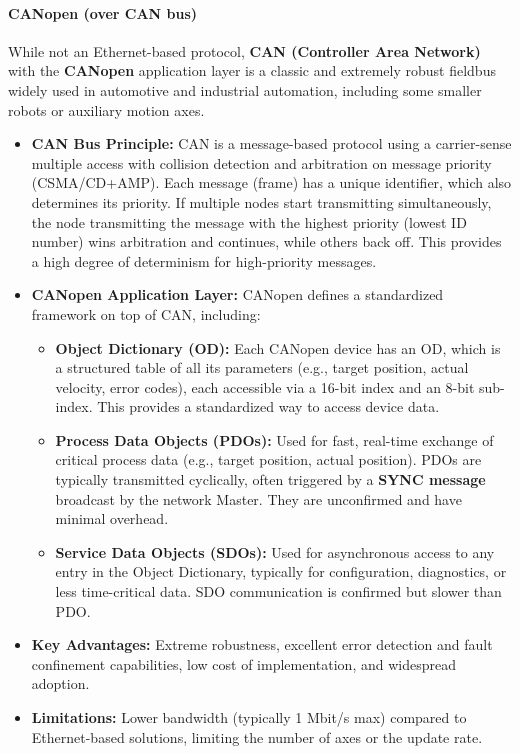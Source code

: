 \paragraph{CANopen (over CAN bus)}
While not an Ethernet-based protocol, \textbf{CAN (Controller Area Network)} with the \textbf{CANopen} application layer is a classic and extremely robust fieldbus widely used in automotive and industrial automation, including some smaller robots or auxiliary motion axes.
\begin{itemize}
    \item \textbf{CAN Bus Principle:} CAN is a message-based protocol using a carrier-sense multiple access with collision detection and arbitration on message priority (CSMA/CD+AMP). Each message (frame) has a unique identifier, which also determines its priority. If multiple nodes start transmitting simultaneously, the node transmitting the message with the highest priority (lowest ID number) wins arbitration and continues, while others back off. This provides a high degree of determinism for high-priority messages.
    \item \textbf{CANopen Application Layer:} CANopen defines a standardized framework on top of CAN, including:
        \begin{itemize}
            \item \textbf{Object Dictionary (OD):} Each CANopen device has an OD, which is a structured table of all its parameters (e.g., target position, actual velocity, error codes), each accessible via a 16-bit index and an 8-bit sub-index. This provides a standardized way to access device data.
            \item \textbf{Process Data Objects (PDOs):} Used for fast, real-time exchange of critical process data (e.g., target position, actual position). PDOs are typically transmitted cyclically, often triggered by a \textbf{SYNC message} broadcast by the network Master. They are unconfirmed and have minimal overhead.
            \item \textbf{Service Data Objects (SDOs):} Used for asynchronous access to any entry in the Object Dictionary, typically for configuration, diagnostics, or less time-critical data. SDO communication is confirmed but slower than PDO.
        \end{itemize}
    \item \textbf{Key Advantages:} Extreme robustness, excellent error detection and fault confinement capabilities, low cost of implementation, and widespread adoption.
    \item \textbf{Limitations:} Lower bandwidth (typically 1 Mbit/s max) compared to Ethernet-based solutions, limiting the number of axes or the update rate.
\end{itemize}

